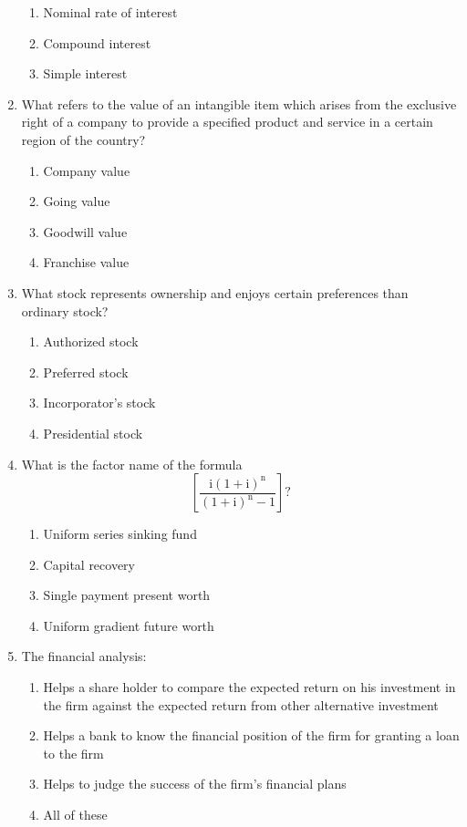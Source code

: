 \documentclass[11pt,a4paper]{article}
\begin{document}
\begin{enumerate}
\begin{enumerate}[label=\Alph*.]
\item{Nominal rate of interest}
\item{Compound interest}
\item{Simple interest}
\end{enumerate}
\item{What refers to the value of an intangible item which arises from the exclusive right of a company to provide a specified product and service in a certain region of the country?}
\begin{enumerate}[label=\Alph*.]
\item{Company value}
\item{Going value}
\item{Goodwill value}
\item{Franchise value}
\end{enumerate}
\item{What stock represents ownership and enjoys certain preferences than ordinary stock?}
\begin{enumerate}[label=\Alph*.]
\item{Authorized stock}
\item{Preferred stock}
\item{Incorporator's stock}
\item{Presidential stock}
\end{enumerate}
\item{What is the factor name of the formula $$\left[ {\frac{{{\text{i}}{{\left( {1 + {\text{i}}} \right)}^{\text{n}}}}}{{{{\left( {1 + {\text{i}}} \right)}^{\text{n}}} - 1}}} \right]?$$}
\begin{enumerate}[label=\Alph*.]
\item{Uniform series sinking fund}
\item{Capital recovery}
\item{Single payment present worth}
\item{Uniform gradient future worth}
\end{enumerate}
\item{The financial analysis:}
\begin{enumerate}[label=\Alph*.]
\item{Helps a share holder to compare the expected return on his investment in the firm against the expected return from other alternative investment}
\item{Helps a bank to know the financial position of the firm for granting a loan to the firm}
\item{Helps to judge the success of the firm's financial plans}
\item{All of these}

\end{enumerate}
\end{enumerate}
\end{document}
